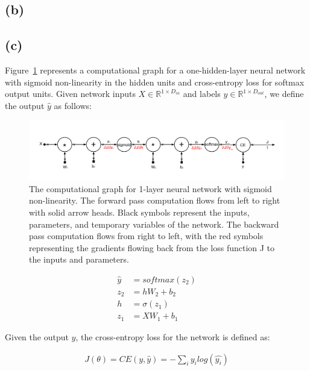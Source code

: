 \documentclass[11pt]{article}
\newcommand{\R}{\mathbb{R}}
\begin{document}
\subsection*{(b)}


\subsection*{(c)}
Figure~\ref{fig:nn-computation-graph} represents a computational graph for a one-hidden-layer neural network with sigmoid non-linearity in the hidden units and cross-entropy loss for softmax output units. Given network inputs $X \in \R^{1 \times D_{in}}$ and labels $y \in \R^{1 \times D_{out}}$, we define the output $\hat{y}$ as follows:

\begin{figure}
  \centering
  \includegraphics[width=\textwidth]{1-layer-network-forward-backward.pdf}

  \caption{The computational graph for 1-layer neural network with sigmoid non-linearity. The forward pass computation flows from left to right with solid arrow heads. Black symbols represent the inputs, parameters, and temporary variables of the network. The backward pass computation flows from right to left, with the red symbols representing the gradients flowing back from the loss function J to the inputs and parameters.}
  \label{fig:nn-computation-graph}
\end{figure}

\begin{equation*}
  \label{eq:forward-pass}
  \begin{split}
    \hat{y} &= softmax(z_{2}) \\
    z_{2} &= hW_{2} + b_{2} \\
    h &= \sigma(z_{1}) \\
    z_{1} &= XW_{1} + b_{1}
  \end{split}
\end{equation*}

Given the output $\hat{y}$, the cross-entropy loss for the network is defined as:

\begin{equation*}
  \label{eq:CE-loss}
  \begin{split}
    J(\theta) = CE(y, \hat{y}) = - \sum_{i} y_{i} log(\hat{y_{i}})
  \end{split}
\end{equation*}
\end{document}
